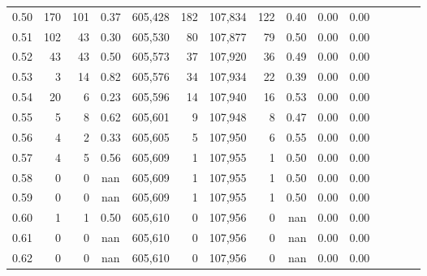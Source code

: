 \begin{tabular}{rrrcrrrrrrrrrrr}
0.50 &     170 &    101 &                                       0.37 &  605,428 &      182 &  107,834 &      122 &  0.40 &  0.00 &                         0.00 \\
0.51 &     102 &     43 &                                       0.30 &  605,530 &       80 &  107,877 &       79 &  0.50 &  0.00 &                         0.00 \\
0.52 &      43 &     43 &                                       0.50 &  605,573 &       37 &  107,920 &       36 &  0.49 &  0.00 &                         0.00 \\
0.53 &       3 &     14 &                                       0.82 &  605,576 &       34 &  107,934 &       22 &  0.39 &  0.00 &                         0.00 \\
0.54 &      20 &      6 &                                       0.23 &  605,596 &       14 &  107,940 &       16 &  0.53 &  0.00 &                         0.00 \\
0.55 &       5 &      8 &                                       0.62 &  605,601 &        9 &  107,948 &        8 &  0.47 &  0.00 &                         0.00 \\
0.56 &       4 &      2 &                                       0.33 &  605,605 &        5 &  107,950 &        6 &  0.55 &  0.00 &                         0.00 \\
0.57 &       4 &      5 &                                       0.56 &  605,609 &        1 &  107,955 &        1 &  0.50 &  0.00 &                         0.00 \\
0.58 &       0 &      0 &                                        nan &  605,609 &        1 &  107,955 &        1 &  0.50 &  0.00 &                         0.00 \\
0.59 &       0 &      0 &                                        nan &  605,609 &        1 &  107,955 &        1 &  0.50 &  0.00 &                         0.00 \\
0.60 &       1 &      1 &                                       0.50 &  605,610 &        0 &  107,956 &        0 &   nan &  0.00 &                         0.00 \\
0.61 &       0 &      0 &                                        nan &  605,610 &        0 &  107,956 &        0 &   nan &  0.00 &                         0.00 \\
0.62 &       0 &      0 &                                        nan &  605,610 &        0 &  107,956 &        0 &   nan &  0.00 &                         0.00 \\

\end{tabular}
